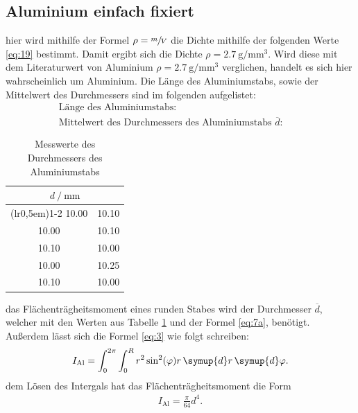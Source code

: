 
\subsection{Aluminium einfach fixiert}\label{sec:4.3}

\justifying hier wird mithilfe der Formel $\rho = \sfrac{m}{V}$ die Dichte mithilfe der folgenden Werte \eqref{eq:19} 
bestimmt. Damit ergibt sich die Dichte $\rho = \SI{2.7}{\gram\per\milli\meter\tothe{3}}$. Wird diese mit dem Literaturwert von Aluminium
$\rho = \SI{2.7}{\gram\per\milli\meter\tothe{3}}$ \cite{Aluminiumdichte} verglichen, handelt es sich hier wahrscheinlich um Aluminium.
Die Länge des Aluminiumstabs, sowie der Mittelwert des Durchmessers sind im folgenden aufgelistet:
\begin{subequations}\label{eq:19}
\begin{align}
    &\text{Länge des Aluminiumstabs:} \qquad &\text{} \label{eq:19a}\\
    &\text{Mittelwert des Durchmessers des Aluminiumstabs $\overline{d}$:} \qquad &\text{} \label{eq:19b}
\end{align}
\end{subequations}

\begin{table}[H]
\centering
    \begin{tabular}{c c}
    \toprule
        \multicolumn{2}{c}{$d \:/\: \si{\milli\meter}$}\\
        \cmidrule(lr{0,5em}){1-2}
        10.00 & 10.10\\
        10.00 & 10.10\\
        10.10 & 10.00\\
        10.00 & 10.25\\
        10.10 & 10.00\\
        \bottomrule
    \end{tabular}
\caption{Messwerte des Durchmessers des Aluminiumstabs}
\label{tab:4}
\end{table}

\justifying das Flächenträgheitsmoment eines runden Stabes wird der Durchmesser $\overline{d}$, welcher mit den Werten aus Tabelle
\ref{tab:4} und der Formel \eqref{eq:7a}, benötigt. Außerdem lässt sich die Formel \eqref{eq:3} 
wie folgt schreiben:
\begin{align}
    I_{\text{Al}}=\int_{0}^{2\pi} \int_{0}^{R} r^2 \sin^2(\varphi) r \, \symup{d}r \, \symup{d}\varphi \label{eq:20}.
\end{align}
\justifying  dem Lösen des Intergals hat das Flächenträgheitsmoment die Form
\begin{align}
     I_{\text{Al}}=\frac{\pi}{64} d^4. \label{eq:21}
\end{align}

